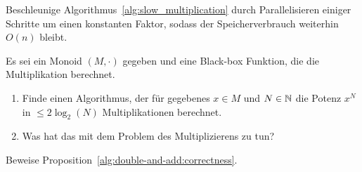 
\begin{sheet}

\begin{problem}[title={Parallelisierung}]
Beschleunige Algorithmus~\ref{alg:slow_multiplication} durch Parallelisieren einiger Schritte um einen konstanten Faktor, sodass der Speicherverbrauch weiterhin $O(n)$ bleibt.
\end{problem}

\begin{problem}[title={Square-and-multiply}]
Es sei ein Monoid $(M,\cdot)$ gegeben und eine Black-box Funktion, die die Multiplikation berechnet.

\begin{enumerate}
\item Finde einen Algorithmus, der für gegebenes $x\in M$ und $N\in\mathbb{N}$ die Potenz $x^N$ in $\leq 2\log_2(N)$ Multiplikationen berechnet.
\item Was hat das mit dem Problem des Multiplizierens zu tun?
\end{enumerate}
\end{problem}

\begin{problem}
Beweise Proposition~\ref{alg:double-and-add:correctness}.
\end{problem}

\end{sheet}
